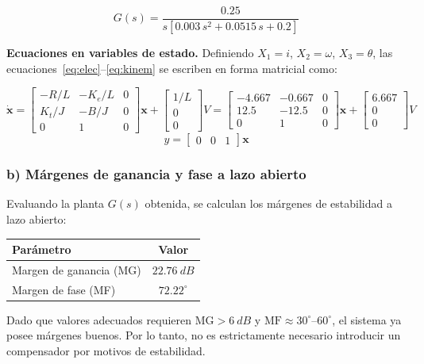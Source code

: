 \documentclass[12pt,a4paper]{article}
\begin{document}
\[
  G(s) = \frac{0.25}{s\!\left[0.003\,s^2 + 0.0515\,s + 0.2\right]}
\]

\textbf{Ecuaciones en variables de estado.}
Definiendo $X_1 = i$, $X_2 = \omega$, $X_3 = \theta$, las ecuaciones~\eqref{eq:elec}--\eqref{eq:kinem} se escriben en forma matricial como:

\[
  \dot{\mathbf{x}} =
  \begin{bmatrix}
    -R/L & -K_e/L & 0 \\
    K_t/J & -B/J & 0 \\
    0 & 1 & 0
  \end{bmatrix}
  \mathbf{x}
  +
  \begin{bmatrix} 1/L \\ 0 \\ 0 \end{bmatrix}
  V
  =
  \begin{bmatrix}
    -4.667 & -0.667 & 0 \\
    12.5 & -12.5 & 0 \\
    0 & 1 & 0
  \end{bmatrix}
  \mathbf{x}
  +
  \begin{bmatrix} 6.667 \\ 0 \\ 0 \end{bmatrix}
  V
\]
\[
  y = \begin{bmatrix} 0 & 0 & 1 \end{bmatrix}\mathbf{x}
\]

\subsubsection*{b) Márgenes de ganancia y fase a lazo abierto}

Evaluando la planta $G(s)$ obtenida, se calculan los márgenes de estabilidad a lazo abierto:

\begin{center}
\begin{tabular}{lc}
  \toprule
  Parámetro & Valor \\
  \midrule
  Margen de ganancia (MG) & $22.76\ \si{dB}$ \\
  Margen de fase (MF)     & $72.22^\circ$ \\
  \bottomrule
\end{tabular}
\end{center}

Dado que valores adecuados requieren $\text{MG} > 6\ \si{dB}$ y $\text{MF} \approx 30^\circ$--$60^\circ$, el sistema ya posee márgenes buenos. Por lo tanto, no es estrictamente necesario introducir un compensador por motivos de estabilidad.
\end{document}
